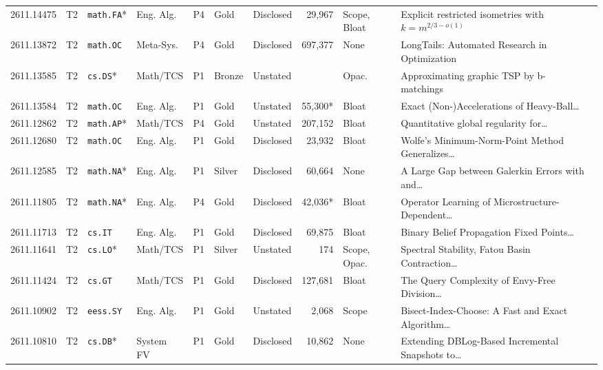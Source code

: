 \documentclass[11pt,letterpaper]{article}
\begin{document}
\begin{longtable}{lllllllrl>{\raggedright\arraybackslash}p{4.05cm}}
2611.14475 & T2 & \texttt{math.FA}* & Eng. Alg. & P4 & Gold & Disclosed & 29,967 & Scope, Bloat & Explicit restricted isometries with $k=m^{2/3-o(1)}$~\cite{arxiv2611_14475} \\
2611.13872 & T2 & \texttt{math.OC} & Meta-Sys. & P4 & Gold & Disclosed & 697,377 & None & LongTails: Automated Research in Optimization~\cite{arxiv2611_13872} \\
2611.13585 & T2 & \texttt{cs.DS}* & Math/TCS & P1 & Bronze & Unstated & \textemdash{} & Opac. & Approximating graphic TSP by b-matchings~\cite{arxiv2611_13585} \\
2611.13584 & T2 & \texttt{math.OC} & Eng. Alg. & P1 & Gold & Unstated & 55,300* & Bloat & Exact (Non-)Accelerations of Heavy-Ball\dots~\cite{arxiv2611_13584} \\
2611.12862 & T2 & \texttt{math.AP}* & Math/TCS & P4 & Gold & Unstated & 207,152 & Bloat & Quantitative global regularity for\dots~\cite{arxiv2611_12862} \\
2611.12680 & T2 & \texttt{math.OC} & Eng. Alg. & P1 & Gold & Disclosed & 23,932 & Bloat & Wolfe's Minimum-Norm-Point Method Generalizes\dots~\cite{arxiv2611_12680} \\
2611.12585 & T2 & \texttt{math.NA}* & Eng. Alg. & P1 & Silver & Disclosed & 60,664 & None & A Large Gap between Galerkin Errors with and\dots~\cite{arxiv2611_12585} \\
2611.11805 & T2 & \texttt{math.NA}* & Eng. Alg. & P4 & Gold & Disclosed & 42,036* & Bloat & Operator Learning of Microstructure-Dependent\dots~\cite{arxiv2611_11805} \\
2611.11713 & T2 & \texttt{cs.IT} & Eng. Alg. & P1 & Gold & Disclosed & 69,875 & Bloat & Binary Belief Propagation Fixed Points\dots~\cite{arxiv2611_11713} \\
2611.11641 & T2 & \texttt{cs.LO}* & Math/TCS & P1 & Silver & Unstated & 174 & Scope, Opac. & Spectral Stability, Fatou Basin Contraction\dots~\cite{arxiv2611_11641} \\
2611.11424 & T2 & \texttt{cs.GT} & Math/TCS & P1 & Gold & Disclosed & 127,681 & Bloat & The Query Complexity of Envy-Free Division\dots~\cite{arxiv2611_11424} \\
2611.10902 & T2 & \texttt{eess.SY} & Eng. Alg. & P1 & Gold & Unstated & 2,068 & Scope & Bisect-Index-Choose: A Fast and Exact Algorithm\dots~\cite{arxiv2611_10902} \\
2611.10810 & T2 & \texttt{cs.DB}* & System FV & P1 & Gold & Disclosed & 10,862 & None & Extending DBLog-Based Incremental Snapshots to\dots~\cite{arxiv2611_10810} \\

\end{longtable}
\end{document}
